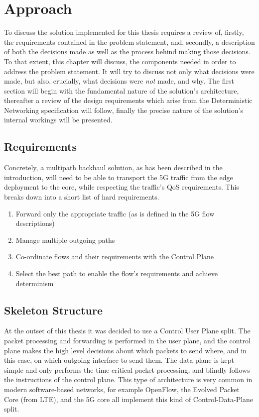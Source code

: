 
\cleardoublepage
\chapter{Approach}
\label{cha:approach}

To discuss the solution implemented for this thesis requires a review of, firstly, the requirements contained in the problem statement, and, secondly, a description of both the decisions made as well as the process behind making those decisions. To that extent, this chapter will discuss, the components needed in order to address the problem statement. It will try to discuss not only what decisions were made, but also, crucially, what decisions were \textit{not} made, and why. The first section will begin with the fundamental nature of the solution's architecture, thereafter a review of the design requirements which arise from the Deterministic Networking specification will follow, finally the precise nature of the solution's internal workings will be presented.

\section{Requirements}

Concretely, a multipath backhaul solution, as has been described in the introduction, will need to be able to transport the 5G traffic from the edge deployment to the core, while respecting the traffic's QoS requirements. This breaks down into a short list of hard requirements.

\begin{enumerate}
  \item Forward only the appropriate traffic (as is defined in the 5G flow descriptions)
  \item Manage multiple outgoing paths
  \item Co-ordinate flows and their requirements with the Control Plane
  \item Select the best path to enable the flow's requirements and achieve determinism
\end{enumerate} 

\section{Skeleton Structure}
\label{sec:approach:plan}

At the outset of this thesis it was decided to use a Control User Plane split. The packet processing and forwarding is performed in the user plane, and the control plane makes the high level decisions about which packets to send where, and in this case, on which outgoing interface to send them. The data plane is kept simple and only performs the time critical packet processing, and blindly follows the instructions of the control plane. This type of architecture is very common in modern software-based networks, for example OpenFlow, the Evolved Packet Core (from LTE), and the 5G core all implement this kind of Control-Data-Plane split.

